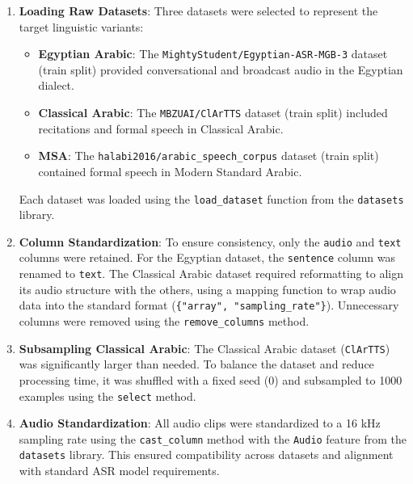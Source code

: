 \documentclass[12pt]{article}
\begin{document}
\begin{enumerate}
    \item \textbf{Loading Raw Datasets}:
        Three datasets were selected to represent the target linguistic variants:
        \begin{itemize}
            \item \textbf{Egyptian Arabic}: The \texttt{MightyStudent/Egyptian-ASR-MGB-3} dataset (train split) provided conversational and broadcast audio in the Egyptian dialect.
            \item \textbf{Classical Arabic}: The \texttt{MBZUAI/ClArTTS} dataset (train split) included recitations and formal speech in Classical Arabic.
            \item \textbf{MSA}: The \texttt{halabi2016/arabic\_speech\_corpus} dataset (train split) contained formal speech in Modern Standard Arabic.
        \end{itemize}
        Each dataset was loaded using the \texttt{load\_dataset} function from the \texttt{datasets} library.

    \item \textbf{Column Standardization}:
        To ensure consistency, only the \texttt{audio} and \texttt{text} columns were retained. For the Egyptian dataset, the \texttt{sentence} column was renamed to \texttt{text}. The Classical Arabic dataset required reformatting to align its audio structure with the others, using a mapping function to wrap audio data into the standard format (\texttt{\{"array", "sampling\_rate"\}}). Unnecessary columns were removed using the \texttt{remove\_columns} method.

    \item \textbf{Subsampling Classical Arabic}:
        The Classical Arabic dataset (\texttt{ClArTTS}) was significantly larger than needed. To balance the dataset and reduce processing time, it was shuffled with a fixed seed (0) and subsampled to 1000 examples using the \texttt{select} method.

    \item \textbf{Audio Standardization}:
        All audio clips were standardized to a 16 kHz sampling rate using the \texttt{cast\_column} method with the \texttt{Audio} feature from the \texttt{datasets} library. This ensured compatibility across datasets and alignment with standard ASR model requirements.


\end{enumerate}
\end{document}
